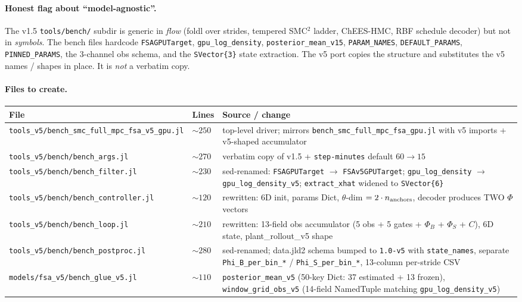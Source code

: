 \documentclass[11pt,a4paper]{article}
\begin{document}
\paragraph{Honest flag about ``model-agnostic''.} The v1.5
\texttt{tools/bench/} subdir is generic in \emph{flow} (foldl over
strides, tempered SMC$^2$ ladder, ChEES-HMC, RBF schedule decoder)
but not in \emph{symbols}. The bench files hardcode
\texttt{FSAGPUTarget}, \texttt{gpu\_log\_density},
\texttt{posterior\_mean\_v15}, \texttt{PARAM\_NAMES},
\texttt{DEFAULT\_PARAMS}, \texttt{PINNED\_PARAMS}, the 3-channel
obs schema, and the \texttt{SVector\{3\}} state extraction. The
v5 port copies the structure and substitutes the v5 names / shapes
in place. It is \emph{not} a verbatim copy.

\paragraph{Files to create.}

\begin{center}\footnotesize
\begin{tabular}{lll}
\toprule
File & Lines & Source / change \\
\midrule
\texttt{tools\_v5/bench\_smc\_full\_mpc\_fsa\_v5\_gpu.jl} & $\sim 250$ & top-level driver; mirrors \texttt{bench\_smc\_full\_mpc\_fsa\_gpu.jl} with v5 imports + v5-shaped accumulator \\
\texttt{tools\_v5/bench/bench\_args.jl}                    & $\sim 270$ & verbatim copy of v1.5 + \texttt{step-minutes} default $60 \to 15$ \\
\texttt{tools\_v5/bench/bench\_filter.jl}                  & $\sim 230$ & sed-renamed: \texttt{FSAGPUTarget} $\to$ \texttt{FSAv5GPUTarget}; \texttt{gpu\_log\_density} $\to$ \texttt{gpu\_log\_density\_v5}; \texttt{extract\_xhat} widened to \texttt{SVector\{6\}} \\
\texttt{tools\_v5/bench/bench\_controller.jl}              & $\sim 120$ & rewritten: 6D init, params Dict, $\theta$-dim $= 2 \cdot n_{\rm anchors}$, decoder produces TWO $\Phi$ vectors \\
\texttt{tools\_v5/bench/bench\_loop.jl}                    & $\sim 210$ & rewritten: 13-field obs accumulator (5 obs + 5 gates + $\Phi_B$ + $\Phi_S$ + $C$), 6D state, plant\_rollout\_v5 shape \\
\texttt{tools\_v5/bench/bench\_postproc.jl}                & $\sim 280$ & sed-renamed; data.jld2 schema bumped to \texttt{1.0-v5} with \texttt{state\_names}, separate \texttt{Phi\_B\_per\_bin\_*} / \texttt{Phi\_S\_per\_bin\_*}, 13-column per-stride CSV \\
\texttt{models/fsa\_v5/bench\_glue\_v5.jl}                  & $\sim 110$ & \texttt{posterior\_mean\_v5} (50-key Dict: 37 estimated + 13 frozen), \texttt{window\_grid\_obs\_v5} (14-field NamedTuple matching \texttt{gpu\_log\_density\_v5}) \\
\bottomrule
\end{tabular}
\end{center}
\end{document}
